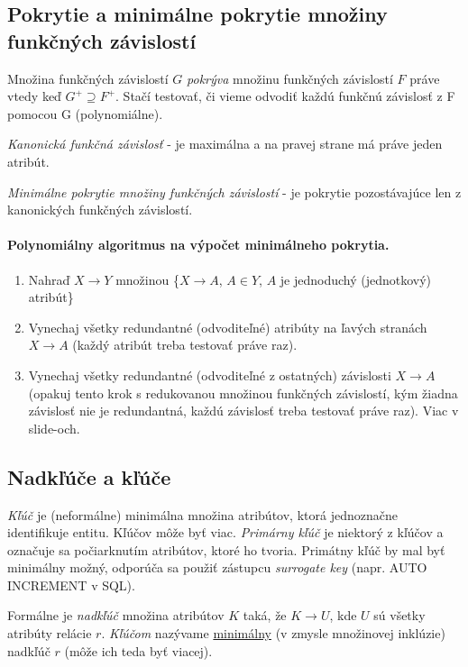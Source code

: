 \documentclass[10pt,a4paper]{article}
\begin{document}
\subsection{Pokrytie a minimálne pokrytie množiny funkčných závislostí}
Množina funkčných závislostí $G$ \emph{pokrýva} množinu funkčných závislostí $F$ práve vtedy keď $G^+ \supseteq F^+$. 
Stačí testovať, či vieme odvodiť každú funkčnú závislosť z F pomocou G (polynomiálne).     

\emph{Kanonická funkčná závislosť} - je maximálna a na pravej strane má práve jeden atribút.     

\emph{Minimálne pokrytie množiny funkčných závislostí} - je pokrytie pozostávajúce len z kanonických funkčných závislostí. 

\paragraph{Polynomiálny algoritmus na výpočet minimálneho pokrytia.}
\begin{enumerate}
\item Nahraď $X \rightarrow Y$ množinou \{$X \rightarrow A$, $A \in Y$, $A$ je jednoduchý (jednotkový) atribút\}
\item Vynechaj všetky redundantné (odvoditeľné) atribúty na ľavých stranách
$X \rightarrow A$ (každý atribút treba testovať práve raz). 
\item Vynechaj všetky redundantné (odvoditeľné z ostatných) závislosti $X \rightarrow A$ (opakuj tento
krok s redukovanou množinou funkčných závislostí, kým
žiadna závislosť nie je redundantná, každú závislosť treba
testovať práve raz). Viac v slide-och. 

\end{enumerate}

\subsection{Nadkľúče a kľúče}

\emph{Kľúč} je (neformálne) minimálna množina atribútov, ktorá
jednoznačne identifikuje entitu. Kľúčov môže byť viac. \emph{Primárny
kľúč} je niektorý z kľúčov a označuje sa počiarknutím atribútov,
ktoré ho tvoria. Primátny kľúč by mal byť minimálny možný, odporúča sa použiť zástupcu \emph{surrogate key} (napr. AUTO INCREMENT v SQL). 

Formálne je \emph{nadkľúč} množina atribútov $K$ taká, že $K \rightarrow U$, kde $U$ sú všetky atribúty relácie $r$. \emph{Kľúčom} nazývame \underline{minimálny} (v zmysle množinovej inklúzie) nadkľúč $r$ (môže ich teda byť viacej).
\end{document}
